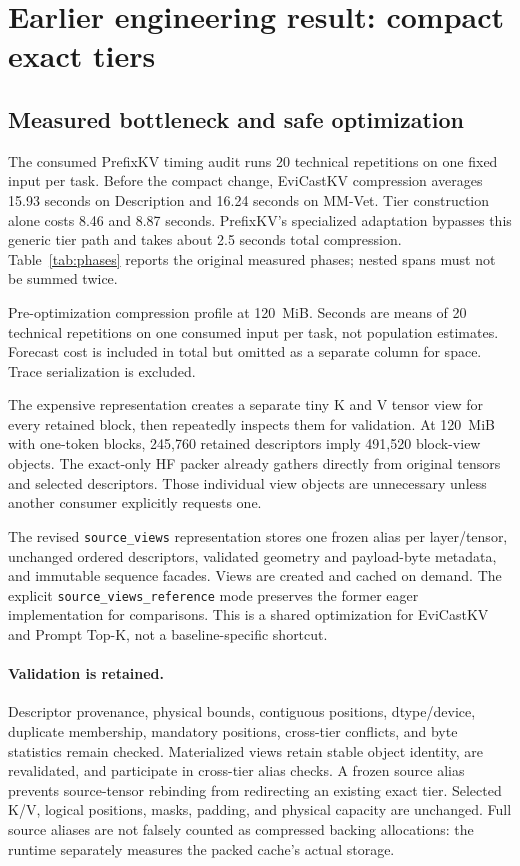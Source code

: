 \documentclass[10pt,letterpaper]{article}
\newcommand{\Evi}{EviCastKV}
\newcommand{\resulttable}[2]{\begin{center}\small\begin{adjustbox}{max width=#1}\end{adjustbox}\end{center}}
\begin{document}
\section{Earlier engineering result: compact exact tiers}
\label{sec:compact}
\subsection{Measured bottleneck and safe optimization}
The consumed PrefixKV timing audit runs 20 technical repetitions on one
fixed input per task. Before the compact change, \Evi{} compression averages
15.93 seconds on Description and 16.24 seconds on MM-Vet. Tier construction
alone costs 8.46 and 8.87 seconds. PrefixKV's specialized adaptation bypasses
this generic tier path and takes about 2.5 seconds total compression.
Table~\ref{tab:phases} reports the original measured phases; nested spans
must not be summed twice.

\begin{table}[htbp]
\caption{Pre-optimization compression profile at 120~MiB. Seconds are
means of 20 technical repetitions on one consumed input per task, not
population estimates. Forecast cost is included in total but omitted as
a separate column for space. Trace serialization is excluded.}
\label{tab:phases}
\resulttable{\linewidth}{compression}
\end{table}

The expensive representation creates a separate tiny K and V tensor view
for every retained block, then repeatedly inspects them for validation.
At 120~MiB with one-token blocks, 245,760 retained descriptors imply
491,520 block-view objects. The exact-only HF packer already gathers
directly from original tensors and selected descriptors. Those individual
view objects are unnecessary unless another consumer explicitly requests
one.

The revised \texttt{source\_views} representation stores one frozen alias
per layer/tensor, unchanged ordered descriptors, validated geometry and
payload-byte metadata, and immutable sequence facades. Views are created
and cached on demand. The explicit \texttt{source\_views\_reference}
mode preserves the former eager implementation for comparisons.
This is a shared optimization for \Evi{} and Prompt Top-K, not a
baseline-specific shortcut.

\paragraph{Validation is retained.}
Descriptor provenance, physical bounds, contiguous positions, dtype/device,
duplicate membership, mandatory positions, cross-tier conflicts, and byte
statistics remain checked. Materialized views retain stable object identity,
are revalidated, and participate in cross-tier alias checks. A frozen
source alias prevents source-tensor rebinding from redirecting an existing
exact tier. Selected K/V, logical positions, masks, padding, and physical
capacity are unchanged. Full source aliases are not falsely counted as
compressed backing allocations: the runtime separately measures the packed
cache's actual storage.
\end{document}
